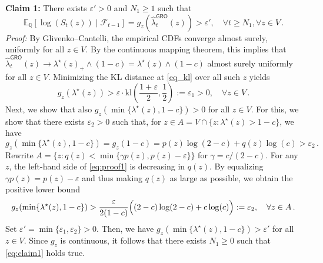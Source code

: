 \documentclass[12pt,twoside]{article}
\theoremstyle{plain}
\theoremstyle{definition}
\theoremstyle{remark}
\newcommand{\calF}{\mathcal{F}}
\newcommand{\Esymb}{\mathbb{E}}
\newcommand{\Qsymb}{\mathbb{Q}}
\renewcommand{\epsilon}{\varepsilon}
\begin{document}
\textbf{Claim 1:} There exists $ \epsilon' >0$ and $N_1\geq 1$ such that 
\begin{equation}\label{eq:claim1}
\Esymb_{\Qsymb}[\log (S_t(z)) \mid \calF_{t-1}]=g_z(\hat{\lambda}_t^\textsf{GRO}(z))>\epsilon', \quad \forall t\geq N_1, \forall z \in V\,.
 \end{equation}
\emph{Proof:} By Glivenko–Cantelli, the empirical CDFs converge almost surely, uniformly for all $z\in V$. By the continuous mapping theorem, this implies that $\hat{\lambda}_t^\textsf{GRO}(z) \to \lambda^\star(z)_+ \land(1-c)=\lambda^\star(z) \land(1-c)$ almost surely uniformly for all $z\in V$. 
Minimizing the KL distance at \eqref{eq_kl} over all such $z$ yields
\begin{equation*}
    g_z(\lambda^\star(z)) > \epsilon \cdot \textrm{kl}\left(\frac{1+\epsilon}{2},\frac{1}{2}\right):= \epsilon_1 >0, \quad \forall z \in V\,.
\end{equation*}
Next, we show that also $g_z(\min\{\lambda^\star(z), 1-c\})>0$ for all $z \in V$. For this, we show that there exists $\epsilon_2>0$ such that, for $z \in A= V \cap \{z :\lambda^\star(z)>1-c\}$, we have
\begin{equation}\label{eq:proof1}
   g_z(\min\{\lambda^\star(z), 1-c\})= g_z(1-c) = p(z) \log(2-c) + q(z) \log(c) > \epsilon_2\,.
\end{equation}
Rewrite $A = \{z : q(z) < \min\{\gamma p(z),p(z)-\epsilon\}\}$ for $\gamma= c/(2-c)$. For any $z$, the left-hand side of \eqref{eq:proof1} is decreasing in $q(z)$. By equalizing $\gamma p(z)=p(z)-\epsilon$ and thus making $q(z)$ as large as possible, we obtain the positive lower bound 
\begin{equation*}
   g_z(\min\{\lambda^\star(z), 1-c\})> \frac{\varepsilon}{2(1-c)}
\Bigl((2-c)\log(2-c) + c\log(c)\Bigr):=\epsilon_2, \quad \forall z \in A\,.
\end{equation*}
Set $\epsilon'= \min\{\epsilon_1,\epsilon_2\}>0.$ Then, we have $g_z(\min\{\lambda^\star(z), 1-c\})>\epsilon'$ for all $z \in V$. Since $g_z$ is continuous, it follows that there exists $N_1\geq 0$ such that \eqref{eq:claim1} holds true.
\end{document}
